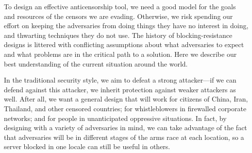 \documentclass{llncs}
\begin{document}
To design an effective anticensorship tool, we need a good model for the
goals and resources of the censors we are evading.  Otherwise, we risk
spending our effort on keeping the adversaries from doing things they have no
interest in doing, and thwarting techniques they do not use.
The history of blocking-resistance designs is littered with conflicting
assumptions about what adversaries to expect and what problems are
in the critical path to a solution. Here we describe our best
understanding of the current situation around the world.

In the traditional security style, we aim to defeat a strong
attacker---if we can defend against this attacker, we inherit protection
against weaker attackers as well.  After all, we want a general design
that will work for citizens of China, Iran, Thailand, and other censored
countries; for
whistleblowers in firewalled corporate networks; and for people in
unanticipated oppressive situations. In fact, by designing with
a variety of adversaries in mind, we can take advantage of the fact that
adversaries will be in different stages of the arms race at each location,
so a server blocked in one locale can still be useful in others.
\end{document}
